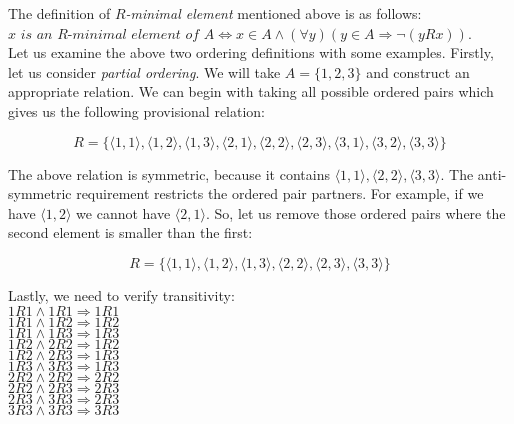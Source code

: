 The definition of $R$\textit{-minimal element} mentioned above is as follows:
$x \textit{ is an }R\textit{-minimal element of }A \Longleftrightarrow x \in A \land (\forall y)(y \in A \Longrightarrow \neg(y R x))$.\\

Let us examine the above two ordering definitions with some examples.  Firstly, let us consider \textit{partial ordering}.  We will take $A=\{1,2,3\}$ and construct an appropriate relation.  We can begin with taking all possible ordered pairs which gives us the following provisional relation:

\begin{displaymath}
R=\{\langle 1,1 \rangle, \langle 1,2 \rangle, \langle 1,3 \rangle, 
\langle 2,1 \rangle,\langle 2,2 \rangle,\langle 2,3 \rangle, 
\langle 3,1 \rangle,\langle 3,2 \rangle,\langle 3,3 \rangle\}
\end{displaymath}

The above relation is symmetric, because it contains $\langle 1,1 \rangle, \langle 2,2 \rangle, \langle 3,3 \rangle$.  The anti-symmetric requirement restricts the ordered pair partners.  For example, if we have $\langle 1,2 \rangle$ we cannot have $\langle 2, 1\rangle$.  So, let us remove those ordered pairs where the second element is smaller than the first:

\begin{displaymath}
R=\{\langle 1,1 \rangle, \langle 1,2 \rangle, \langle 1,3 \rangle, 
\langle 2,2 \rangle,\langle 2,3 \rangle, \langle 3,3 \rangle\}
\end{displaymath}

Lastly, we need to verify transitivity:\\
$1R1 \land 1R1 \Longrightarrow 1R1$ \\
$1R1 \land 1R2 \Longrightarrow 1R2$ \\
$1R1 \land 1R3 \Longrightarrow 1R3$ \\
$1R2 \land 2R2 \Longrightarrow 1R2$ \\
$1R2 \land 2R3 \Longrightarrow 1R3$ \\
$1R3 \land 3R3 \Longrightarrow 1R3$ \\
$2R2 \land 2R2 \Longrightarrow 2R2$ \\
$2R2 \land 2R3 \Longrightarrow 2R3$ \\
$2R3 \land 3R3 \Longrightarrow 2R3$ \\
$3R3 \land 3R3 \Longrightarrow 3R3$ \\

